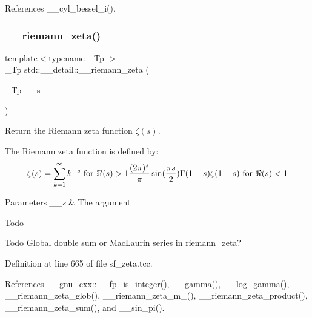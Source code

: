 References \+\_\+\+\_\+cyl\+\_\+bessel\+\_\+i().

\mbox{\label{namespacestd_1_1____detail_a2be77d9bdd1b8b463be44a0e7558bc2a}} 
\subsubsection{\texorpdfstring{\+\_\+\+\_\+riemann\+\_\+zeta()}{\_\_riemann\_zeta()}}
{\footnotesize\ttfamily template$<$typename \+\_\+\+Tp $>$ \\
\+\_\+\+Tp std\+::\+\_\+\+\_\+detail\+::\+\_\+\+\_\+riemann\+\_\+zeta (\begin{DoxyParamCaption}\item[{\+\_\+\+Tp}]{\+\_\+\+\_\+s }\end{DoxyParamCaption})}



Return the Riemann zeta function $ \zeta(s) $. 

The Riemann zeta function is defined by\+: \[ \zeta(s) = \sum_{k=1}^{\infty} k^{-s} \mbox{ for } \Re(s) > 1 \\ \frac{(2\pi)^s}{\pi} \sin(\frac{\pi s}{2}) \Gamma(1 - s) \zeta(1 - s) \mbox{ for } \Re(s) < 1 \]


\begin{DoxyParams}{Parameters}
{\em \+\_\+\+\_\+s} & The argument \\
\hline
\end{DoxyParams}
\begin{DoxyRefDesc}{Todo}
\item[\hyperlink{todo__todo000018}{Todo}]Global double sum or Mac\+Laurin series in riemann\+\_\+zeta? \end{DoxyRefDesc}


Definition at line 665 of file sf\+\_\+zeta.\+tcc.



References \+\_\+\+\_\+gnu\+\_\+cxx\+::\+\_\+\+\_\+fp\+\_\+is\+\_\+integer(), \+\_\+\+\_\+gamma(), \+\_\+\+\_\+log\+\_\+gamma(), \+\_\+\+\_\+riemann\+\_\+zeta\+\_\+glob(), \+\_\+\+\_\+riemann\+\_\+zeta\+\_\+m\+\_(), \+\_\+\+\_\+riemann\+\_\+zeta\+\_\+product(), \+\_\+\+\_\+riemann\+\_\+zeta\+\_\+sum(), and \+\_\+\+\_\+sin\+\_\+pi().



